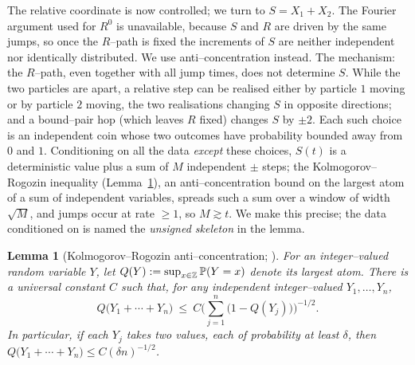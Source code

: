 \documentclass[11pt]{article}
\theoremstyle{plain}
\newtheorem{lemma}[theorem]{Lemma}
\theoremstyle{definition}
\theoremstyle{remark}
\newcommand{\Z}{\mathbb{Z}}\newcommand{\R}{\mathbb{R}}\newcommand{\N}{\mathbb{N}}
\begin{document}
The relative coordinate is now controlled; we turn to $S=X_1+X_2$. The Fourier argument
used for $R^0$ is unavailable, because $S$ and $R$ are driven by the same jumps, so once
the $R$--path is fixed the increments of $S$ are neither independent nor identically
distributed. We use anti--concentration instead. The mechanism: the $R$--path, even
together with all jump times, does not determine $S$. While the two particles are apart,
a relative step can be realised either by particle $1$ moving or by particle $2$ moving,
the two realisations changing $S$ in opposite directions; and a bound--pair hop (which
leaves $R$ fixed) changes $S$ by $\pm2$. Each such choice is an independent coin whose
two outcomes have probability bounded away from $0$ and $1$. Conditioning on all the data
\emph{except} these choices, $S(t)$ is a deterministic value plus a sum of $M$
independent $\pm$ steps; the Kolmogorov--Rogozin inequality (Lemma~\ref{lem:KR}), an
anti--concentration bound on the largest atom of a sum of independent variables, spreads
such a sum over a window of width $\sqrt M$, and jumps occur at rate $\ge1$, so
$M\gtrsim t$. We make this precise; the data conditioned on is named the \emph{unsigned
skeleton} in the lemma.

\begin{lemma}[Kolmogorov--Rogozin anti--concentration; {\cite[Ch.~III]{Petrov}}]
\label{lem:KR}
For an integer--valued random variable $Y$, let $Q(Y):=\sup_{x\in\Z}\PP(Y=x)$ denote
its largest atom. There is a universal constant $C$ such that, for any independent
integer--valued $Y_1,\dots,Y_n$,
\[
  Q\big(Y_1+\cdots+Y_n\big)\ \le\
  C\Big(\textstyle\sum_{j=1}^n\big(1-Q(Y_j)\big)\Big)^{-1/2}.
\]
In particular, if each $Y_j$ takes two values, each of probability at least $\delta$,
then $Q\big(Y_1+\cdots+Y_n\big)\le C(\delta n)^{-1/2}$.
\end{lemma}
\end{document}
